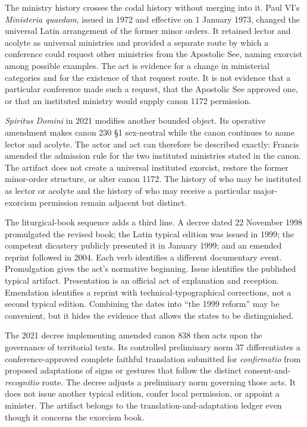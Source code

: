 The ministry history crosses the codal history without merging into it.
Paul VI's \emph{Ministeria quaedam}, issued in 1972 and effective on
1 January 1973, changed the universal Latin arrangement of the former minor
orders. It retained lector and acolyte as universal ministries and provided a
separate route by which a conference could request other ministries from the
Apostolic See, naming exorcist among possible examples. The act is evidence
for a change in ministerial categories and for the existence of that request
route. It is not evidence that a particular conference made such a request,
that the Apostolic See approved one, or that an instituted ministry would
supply canon 1172 permission.

\emph{Spiritus Domini} in 2021 modifies another bounded object. Its operative
amendment makes canon 230 \S1 sex-neutral while the canon continues to name
lector and acolyte. The actor and act can therefore be described exactly:
Francis amended the admission rule for the two instituted ministries stated
in the canon. The artifact does not create a universal instituted exorcist,
restore the former minor-order structure, or alter canon 1172. The history of
who may be instituted as lector or acolyte and the history of who may receive
a particular major-exorcism permission remain adjacent but distinct.

The liturgical-book sequence adds a third line. A decree dated
22 November 1998 promulgated the revised book; the Latin typical edition was
issued in 1999; the competent dicastery publicly presented it in January
1999; and an emended reprint followed in 2004. Each verb identifies a
different documentary event. Promulgation gives the act's normative
beginning. Issue identifies the published typical artifact. Presentation is
an official act of explanation and reception. Emendation identifies a reprint
with technical-typographical corrections, not a second typical edition. Combining the
dates into ``the 1999 reform'' may be convenient, but it hides the evidence
that allows the states to be distinguished.

The 2021 decree implementing amended canon 838 then acts upon the governance
of territorial texts. Its controlled preliminary norm 37 differentiates a
conference-approved complete faithful translation submitted for
\emph{confirmatio} from proposed adaptations of signs or gestures that follow
the distinct consent-and-\emph{recognitio} route. The decree adjusts a
preliminary norm governing those acts. It does not issue another typical
edition, confer local permission, or appoint a minister. The artifact belongs
to the translation-and-adaptation ledger even though it concerns the
exorcism book.

